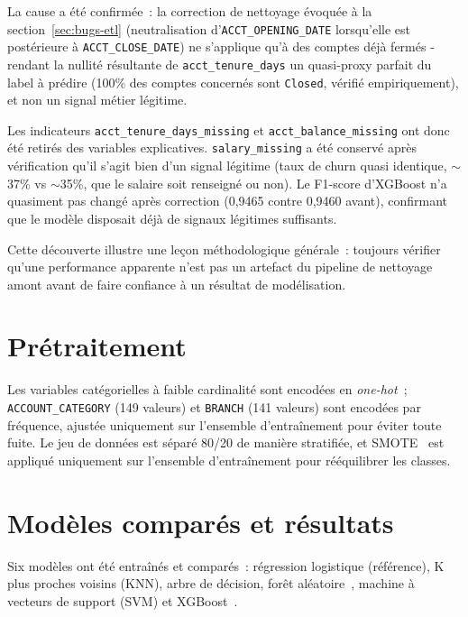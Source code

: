\documentclass[11pt,a4paper]{report}
\renewenvironment{quote}{\begin{quotebox}}{\end{quotebox}}
\begin{document}
La cause a \'et\'e confirm\'ee~: la correction de nettoyage \'evoqu\'ee \`a la
section~\ref{sec:bugs-etl} (neutralisation d'\texttt{ACCT\_OPENING\_DATE}
lorsqu'elle est post\'erieure \`a \texttt{ACCT\_CLOSE\_DATE}) ne s'applique qu'\`a
des comptes d\'ej\`a ferm\'es - rendant la nullit\'e r\'esultante de
\texttt{acct\_tenure\_days} un quasi-proxy parfait du label \`a pr\'edire (100\%
des comptes concern\'es sont \texttt{Closed}, v\'erifi\'e empiriquement), et non un
signal m\'etier l\'egitime.

Les indicateurs \texttt{acct\_tenure\_days\_missing} et
\texttt{acct\_balance\_missing} ont donc \'et\'e retir\'es des variables
explicatives. \texttt{salary\_missing} a \'et\'e conserv\'e apr\`es v\'erification
qu'il s'agit bien d'un signal l\'egitime (taux de churn quasi identique,
$\sim$37\% vs $\sim$35\%, que le salaire soit renseign\'e ou non). Le F1-score
d'XGBoost n'a quasiment pas chang\'e apr\`es correction (0,9465 contre 0,9460
avant), confirmant que le mod\`ele disposait d\'ej\`a de signaux l\'egitimes
suffisants.

\begin{quote}
Cette d\'ecouverte illustre une le\c{c}on m\'ethodologique g\'en\'erale~: toujours
v\'erifier qu'une performance apparente n'est pas un artefact du pipeline de
nettoyage amont avant de faire confiance \`a un r\'esultat de mod\'elisation.
\end{quote}

\section{Pr\'etraitement}

Les variables cat\'egorielles \`a faible cardinalit\'e sont encod\'ees en
\emph{one-hot}~; \texttt{ACCOUNT\_CATEGORY} (149 valeurs) et
\texttt{BRANCH} (141 valeurs) sont encod\'ees par fr\'equence, ajust\'ee
uniquement sur l'ensemble d'entra\^inement pour \'eviter toute fuite. Le jeu de
donn\'ees est s\'epar\'e 80/20 de mani\`ere stratifi\'ee, et SMOTE~\citep{chawla2002smote}
est appliqu\'e uniquement sur l'ensemble d'entra\^inement pour r\'e\'equilibrer les
classes.

\section{Mod\`eles compar\'es et r\'esultats}

Six mod\`eles ont \'et\'e entra\^in\'es et compar\'es~: r\'egression logistique
(r\'ef\'erence), K plus proches voisins (KNN), arbre de d\'ecision, for\^et
al\'eatoire~\citep{breiman2001random}, machine \`a vecteurs de support (SVM) et
XGBoost~\citep{chen2016xgboost}.
\end{document}
